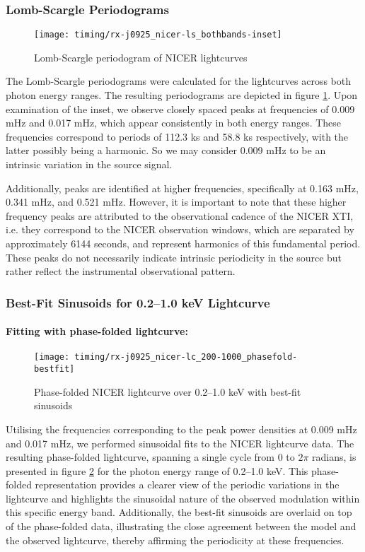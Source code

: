 			\subsubsection{Lomb-Scargle Periodograms}
				\begin{figure}[h!]
					\centering
					\texttt{[image: timing/rx-j0925\_nicer-ls\_bothbands-inset]}
					\caption{Lomb-Scargle periodogram of NICER lightcurves}
					\label{result:ls-mrvel-nicer}
				\end{figure}
				The Lomb-Scargle periodograms were calculated for the lightcurves across both photon energy ranges. The resulting periodograms are depicted in figure \ref{result:ls-mrvel-nicer}. Upon examination of the inset, we observe closely spaced peaks at frequencies of 0.009 mHz and 0.017 mHz, which appear consistently in both energy ranges. These frequencies correspond to periods of 112.3 ks and 58.8 ks respectively, with the latter possibly being a harmonic. So we may consider 0.009 mHz to be an intrinsic variation in the source signal.
				
				Additionally, peaks are identified at higher frequencies, specifically at 0.163 mHz, 0.341 mHz, and 0.521 mHz. However, it is important to note that these higher frequency peaks are attributed to the observational cadence of the NICER XTI, i.e. they correspond to the NICER observation windows, which are separated by approximately 6144 seconds, and represent harmonics of this fundamental period. These peaks do not necessarily indicate intrinsic periodicity in the source but rather reflect the instrumental observational pattern.
			
			\subsubsection{Best-Fit Sinusoids for 0.2--1.0 keV Lightcurve}
				\paragraph{Fitting with phase-folded lightcurve:}
				\begin{figure}[h!]
					\centering
					\texttt{[image: timing/rx-j0925\_nicer-lc\_200-1000\_phasefold-bestfit]}
					\caption{Phase-folded NICER lightcurve over 0.2--1.0 keV with best-fit sinusoids}
					\label{result:lc-phase-fold-mrvel-nicer:200-1000-bestfit}
				\end{figure}
				Utilising the frequencies corresponding to the peak power densities at 0.009 mHz and 0.017 mHz, we performed sinusoidal fits to the NICER lightcurve data. The resulting phase-folded lightcurve, spanning a single cycle from 0 to $2\pi$ radians, is presented in figure \ref{result:lc-phase-fold-mrvel-nicer:200-1000-bestfit} for the photon energy range of 0.2--1.0 keV. This phase-folded representation provides a clearer view of the periodic variations in the lightcurve and highlights the sinusoidal nature of the observed modulation within this specific energy band. Additionally, the best-fit sinusoids are overlaid on top of the phase-folded data, illustrating the close agreement between the model and the observed lightcurve, thereby affirming the periodicity at these frequencies.
				
